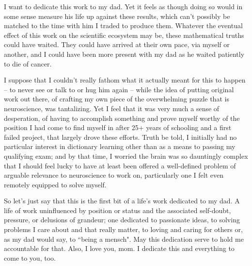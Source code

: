 \documentclass{ucbthesis}
\begin{document}
\begin{frontmatter}

\begin{dedication}
\null\vfil
I want to dedicate this work to my dad. Yet it feels as though doing so would in some sense measure his life up against these results, which can't possibly be matched to the time with him I traded to produce them. Whatever the eventual effect of this work on the scientific ecosystem may be, these mathematical truths could have waited. They could have arrived at their own pace, via myself or another, and I could have been more present with my dad as he waited patiently to die of cancer. 

I suppose that I couldn't really fathom what it actually meant for this to happen -- to never see or talk to or hug him again -- while the idea of putting original work out there, of crafting my own piece of the overwhelming puzzle that is neuroscience, was tantalizing. Yet I feel that it was very much a sense of desperation, of having to accomplish something and prove myself worthy of the position I had come to find myself in after 25+ years of schooling and a first failed project, that largely drove these efforts. Truth be told, I initially had no particular interest in dictionary learning other than as a means to passing my qualifying exam; and by that time, I worried the brain was so dauntingly complex that I should feel lucky to have at least been offered a well-defined problem of arguable relevance to neuroscience to work on, particularly one I felt even remotely equipped to solve myself.

So let's just say that this is the first bit of a life's work dedicated to my dad. A life of work uninfluenced by position or status and the associated self-doubt, pressure, or delusions of grandeur; one dedicated to passionate ideas, to solving problems I care about and that really matter, to loving and caring for others or, as my dad would say, to ``being a mensch". May this dedication serve to hold me accountable for that. Also, I love you, mom. I dedicate this and everything to come to you, too.

\vspace{12pt}
\vfil\null
\end{dedication}



\end{frontmatter}
\end{document}
